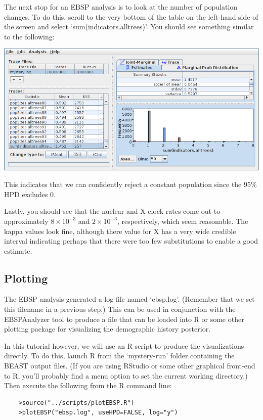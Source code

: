 \documentclass[a4paper,11pt]{article}
\begin{document}
The next stop for an EBSP analysis is to look at the number of population
changes. To do this, scroll to the very bottom of the table on the left-hand
side of the screen and select `sum(indicators.alltrees)'.  You should see
something similar to the following:

\includegraphics[width=\textwidth]{figures/tracer2.png}

This indicates that we can confidently reject a constant population since the
95\% HPD excludes 0.

Lastly, you should see that the nuclear and X clock rates come out to
approximately $8\times 10^{-3}$ and $2\times 10^{-3}$, respectively, which seem
reasonable.  The kappa values look fine, although there value for X has a very
wide credible interval indicating perhaps that there were too few substitutions
to enable a good estimate.

\subsection{Plotting}

The EBSP analysis generated a log file named `ebsp.log'.  (Remember that we set
this filename in a previous step.)  This can be used in conjunction with the
EBSPAnalyzer tool to produce a file that can be loaded into R or some other
plotting package for visualizing the demographic history posterior.

In this tutorial however, we will use an R script to produce the visualizations
directly. To do this, launch R from the `mystery-run' folder containing the
BEAST output files. (If you are using RStudio or some other graphical front-end
to R, you'll probably find a menu option to set the current working directory.)
Then execute the following from the R command line:
\begin{verbatim}
    >source("../scripts/plotEBSP.R")
    >plotEBSP("ebsp.log", useHPD=FALSE, log="y")
\end{verbatim}
\end{document}
